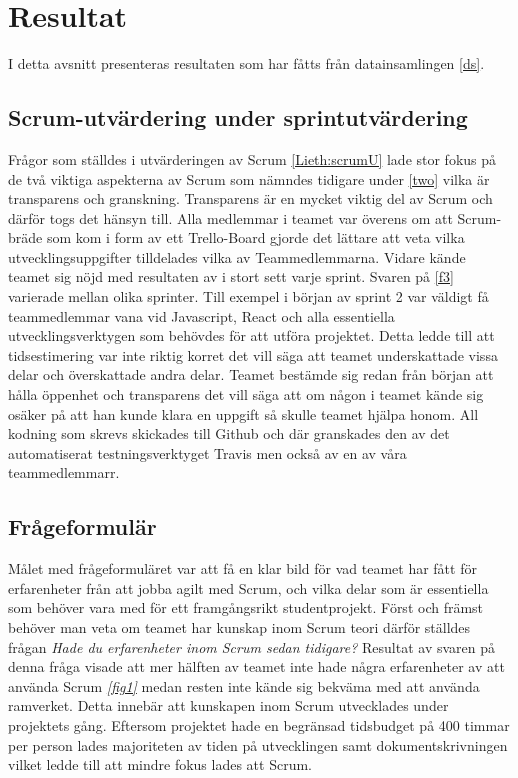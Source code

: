 \section{Resultat}
\label{sec:Lieth_Wahid-results}
I detta avsnitt presenteras resultaten som har fåtts från datainsamlingen \ref{ds}.
\subsection{Scrum-utvärdering under sprintutvärdering}
Frågor som ställdes i utvärderingen av Scrum \ref{Lieth:scrumU} lade stor fokus på de två viktiga aspekterna av Scrum som nämndes tidigare under \ref{two} vilka är transparens och granskning.
Transparens är en mycket viktig del av Scrum och därför togs det hänsyn till. Alla medlemmar i teamet var överens om att Scrum-bräde som kom i form av ett Trello-Board gjorde det lättare att veta vilka 
utvecklingsuppgifter tilldelades vilka av Teammedlemmarna. Vidare kände teamet sig nöjd med resultaten av i stort sett varje sprint. Svaren på \ref{f3} varierade mellan olika sprinter. Till exempel i början av sprint 2 var väldigt få teammedlemmar vana vid Javascript, React och alla essentiella utvecklingsverktygen som behövdes för att utföra projektet. Detta ledde till att tidsestimering var inte riktig korret det vill säga att teamet underskattade vissa delar och överskattade andra delar. Teamet bestämde sig redan från
början att hålla öppenhet och transparens det vill säga att om någon i teamet kände sig osäker på att han kunde klara en uppgift så skulle teamet hjälpa honom. All kodning som skrevs skickades till Github och där granskades den av det automatiserat testningsverktyget Travis men också av en av våra teammedlemmarr.

\subsection{Frågeformulär}
Målet med frågeformuläret var att få en klar bild för vad teamet har fått för erfarenheter från att jobba agilt med Scrum, och vilka delar som är essentiella som behöver vara med för ett framgångsrikt studentprojekt. Först och främst behöver man veta om teamet har kunskap inom Scrum teori därför ställdes frågan \textit{Hade du erfarenheter inom Scrum sedan tidigare? } Resultat av svaren på denna fråga visade att mer hälften av teamet inte hade några erfarenheter av att använda Scrum \textit{ \ref{fig1} } medan resten inte kände sig bekväma med att använda ramverket. Detta innebär att kunskapen inom Scrum utvecklades under projektets gång. Eftersom projektet hade en begränsad tidsbudget på 400 timmar per person lades majoriteten av tiden på utvecklingen samt dokumentskrivningen vilket ledde till att mindre fokus lades att Scrum.  

